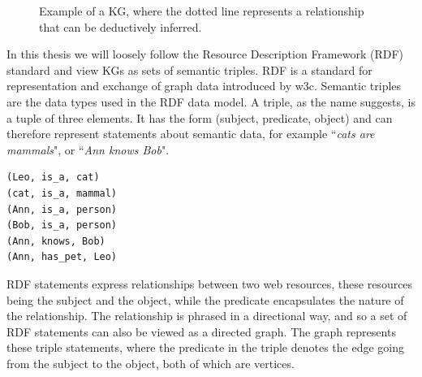 \begin{figure}[htbp]
\centering
{}

\caption[Simple visual example of a KG.]{Example of a KG, where the dotted line represents a relationship that can be deductively inferred.} \label{fig:KGexample}
\end{figure}

In this thesis we will loosely follow the Resource Description Framework (RDF) standard and view KGs as sets of semantic triples. RDF is a standard for representation and exchange of graph data introduced by \gls{w3c}. Semantic triples are the data types used in the RDF data model. A triple, as the name suggests, is a tuple of three elements. It has the form (subject, predicate, object) and can therefore represent statements about semantic data, for example ``\textit{cats are mammals}", or ``\textit{Ann knows Bob}". 
\begin{lstlisting}[caption={Example of RDF triple set written in informal pseudocode.}, label={RDF_triples_example}]
(Leo, is_a, cat)
(cat, is_a, mammal)
(Ann, is_a, person)
(Bob, is_a, person)
(Ann, knows, Bob)
(Ann, has_pet, Leo)
\end{lstlisting}
RDF statements express relationships between two web resources, these resources being the subject and the object, while the predicate encapsulates the nature of the relationship. The relationship is phrased in a directional way, and so a set of RDF statements can also be viewed as a directed graph. The graph represents these triple statements, where the predicate in the triple denotes the edge going from the subject to the object, both of which are vertices.

